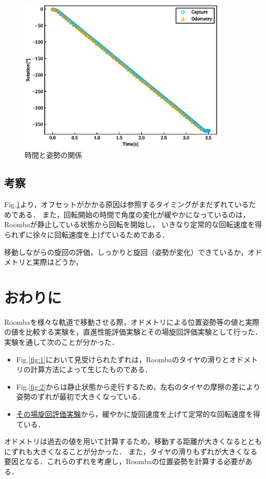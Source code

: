\documentclass[a4paper,11pt]{jsarticle}
\begin{document}
\begin{figure}[H] %
        \begin{center}
        \includegraphics[width=100mm]{../graph/RotTimturn.eps}
        \caption{時間と姿勢の関係}%
        \label{fig:RotTimturn}
        \end{center}
\end{figure}

\subsection{考察}
Fig.{\ref{fig:RotTimturn}}より，オフセットがかかる原因は参照するタイミングがまだずれているためである．
また，回転開始の時間で角度の変化が緩やかになっているのは，Roombaが静止している状態から回転を開始し，
いきなり定常的な回転速度を得られずに徐々に回転速度を上げているためである．

移動しながらの旋回の評価，しっかりと旋回（姿勢が変化）できているか，オドメトリと実際はどうか，
\newpage
\section{おわりに}
Roombaを様々な軌道で移動させる際，オドメトリによる位置姿勢等の値と実際の値を比較する実験を，直進性能評価実験とその場旋回評価実験として行った．
実験を通して次のことが分かった．
\begin{itemize}
        \item Fig.{\ref{fig:1}}において見受けられたずれは，Roombaのタイヤの滑りとオドメトリの計算方法によって生じたものである．
        \item Fig.\ref{fig:2}からは静止状態から走行するため，左右のタイヤの摩擦の差により姿勢のずれが最初で大きくなっている．
        \item \hyperref[experi]{その場旋回評価実験}から，緩やかに旋回速度を上げて定常的な回転速度を得ている．
\end{itemize}
オドメトリは過去の値を用いて計算するため，移動する距離が大きくなるとともにずれも大きくなることが分かった．
また，タイヤの滑りもずれが大きくなる要因となる．これらのずれを考慮し，Roombaの位置姿勢を計算する必要がある．
\end{document}
